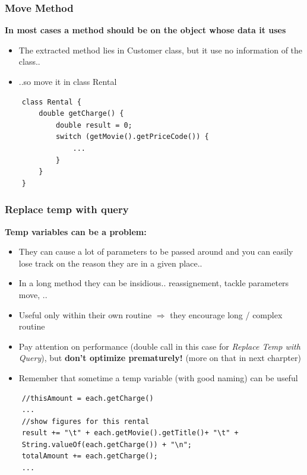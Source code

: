 \documentclass{beamer}
\begin{document}
\begin{frame}[containsverbatim]
  \frametitle{Move Method}
  \textbf{In most cases a method should be on the object whose data it uses}
   \begin{itemize}
  		\item The extracted method lies in Customer class, but it use no information of the class..
		\item ..so move it in class Rental
  \end{itemize}
  \begin{lstlisting}
	class Rental {
		double getCharge() {
			double result = 0;
			switch (getMovie().getPriceCode()) {
				...
			}
		}
	}
	\end{lstlisting}
\end{frame}

\begin{frame}[containsverbatim]
  \frametitle{Replace temp with query}
  \textbf{Temp variables can be a problem:}
   \begin{itemize}
  		\item They can cause a lot of parameters to be passed around and you can easily lose track on the reason they are in a given place..
		\item In a long method they can be insidious.. reassignement, tackle parameters move, ..
		\item Useful only within their own routine $\Rightarrow$  they encourage long / complex routine
		\item Pay attention on performance (double call in this case for \textit{Replace Temp 
with Query}), but \textbf{don't optimize prematurely!} (more on that in next charpter)
		\item Remember that sometime a temp variable (with good naming) can be useful
  \end{itemize}
  \begin{lstlisting}
  	//thisAmount = each.getCharge()
	...
	//show figures for this rental
	result += "\t" + each.getMovie().getTitle()+ "\t" +
	String.valueOf(each.getCharge()) + "\n";
	totalAmount += each.getCharge();
	...
	\end{lstlisting}
\end{frame}
\end{document}
